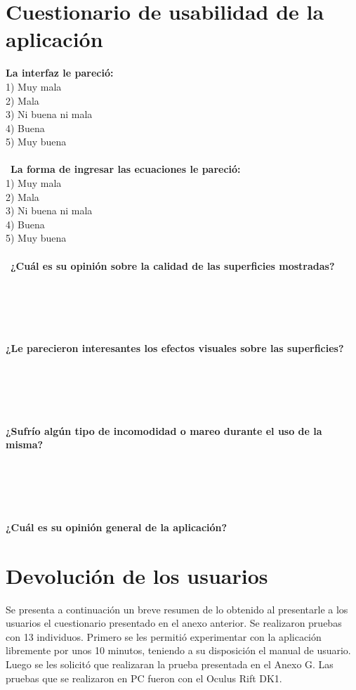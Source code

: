 \documentclass[12pt]{article}
\begin{document}
\section{Cuestionario de usabilidad de la aplicación}
\textbf{La interfaz le pareció:}
\\ 1) Muy mala
\\ 2) Mala
\\ 3) Ni buena ni mala
\\ 4) Buena
\\ 5) Muy buena
\\\\\
\textbf{La forma de ingresar las ecuaciones le pareció:}
\\ 1) Muy mala
\\ 2) Mala
\\ 3) Ni buena ni mala
\\ 4) Buena
\\ 5) Muy buena
\\\\\
\textbf{¿Cuál es su opinión sobre la calidad de las superficies mostradas?}
\\\\\\\\\\\\
\textbf{¿Le parecieron interesantes los efectos visuales sobre las superficies?}
\\\\\\\\\\\\
\textbf{¿Sufrío algún tipo de incomodidad o mareo durante el uso de la misma?}
\\\\\\\\\\\\
\textbf{¿Cuál es su opinión general de la aplicación?}
\clearpage
\section{Devolución de los usuarios}
Se presenta a continuación un breve resumen de lo obtenido al presentarle a los usuarios el cuestionario presentado en el anexo anterior. Se realizaron pruebas con 13 individuos. Primero se les permitió experimentar con la aplicación libremente por unos 10 minutos, teniendo a su disposición el manual de usuario. Luego se les solicitó que realizaran la prueba presentada en el Anexo G. Las pruebas que se realizaron en PC fueron con el Oculus Rift DK1.
\end{document}
